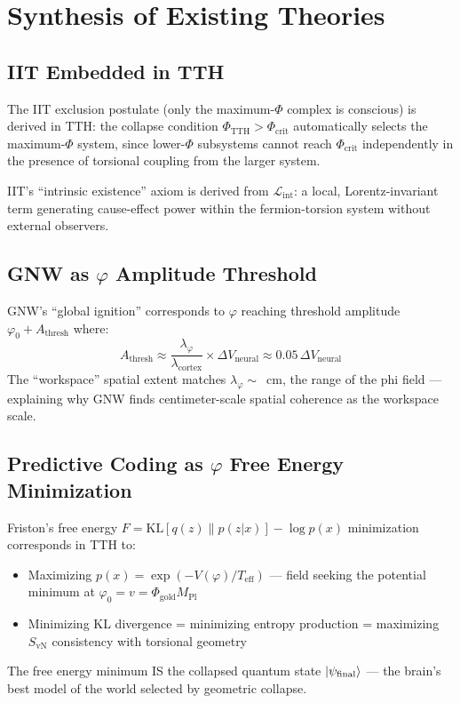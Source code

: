 \documentclass[12pt,a4paper]{article}
\newcommand{\MPl}{M_{\mathrm{Pl}}}
\newcommand{\phicrit}{\Phi_{\mathrm{crit}}}
\newcommand{\phiTTH}{\Phi_{\mathrm{TTH}}}
\newcommand{\SvN}{S_{\mathrm{vN}}}
\newcommand{\phigold}{\Phi_{\mathrm{gold}}}
\numberwithin{equation}{section}
\begin{document}
\section{Synthesis of Existing Theories}
\label{sec:synthesis}

\subsection{IIT Embedded in TTH}

The IIT exclusion postulate (only the maximum-$\Phi$ complex is conscious)
is derived in TTH: the collapse condition $\phiTTH > \phicrit$ automatically
selects the maximum-$\Phi$ system, since lower-$\Phi$ subsystems cannot
reach $\phicrit$ independently in the presence of torsional coupling
from the larger system.

IIT's ``intrinsic existence'' axiom is derived from $\mathcal{L}_{\mathrm{int}}$:
a local, Lorentz-invariant term generating cause-effect power within the
fermion-torsion system without external observers.

\subsection{GNW as $\varphi$ Amplitude Threshold}

GNW's ``global ignition'' corresponds to $\varphi$ reaching threshold amplitude
$\varphi_0 + A_{\mathrm{thresh}}$ where:
\begin{equation}
  A_{\mathrm{thresh}} \approx \frac{\lambda_\varphi}{\lambda_{\mathrm{cortex}}}
  \times\Delta V_{\mathrm{neural}} \approx 0.05\,\Delta V_{\mathrm{neural}}
  \label{eq:GNW_threshold}
\end{equation}
The ``workspace'' spatial extent matches $\lambda_\varphi \sim$~cm, the range
of the phi field --- explaining why GNW finds centimeter-scale spatial coherence
as the workspace scale.

\subsection{Predictive Coding as $\varphi$ Free Energy Minimization}

Friston's free energy $F = \mathrm{KL}[q(z)\|p(z|x)] - \log p(x)$ minimization
corresponds in TTH to:
\begin{itemize}[leftmargin=2em]
  \item Maximizing $p(x) = \exp(-V(\varphi)/T_{\mathrm{eff}})$ --- field
    seeking the potential minimum at $\varphi_0 = v = \phigold\MPl$
  \item Minimizing KL divergence = minimizing entropy production
    = maximizing $\SvN$ consistency with torsional geometry
\end{itemize}
The free energy minimum IS the collapsed quantum state $\Ket{\psi_{\mathrm{final}}}$
--- the brain's best model of the world selected by geometric collapse.
\end{document}
